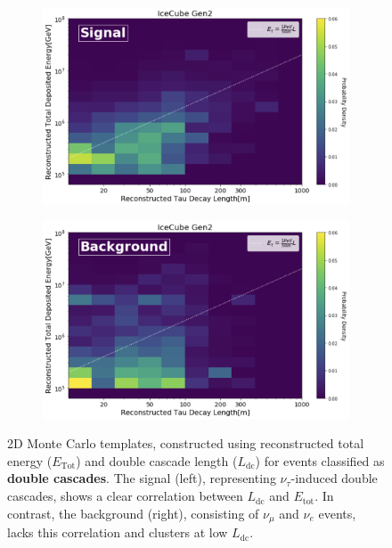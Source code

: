 \begin{figure}[h]
    \begin{subfigure}[h]{0.7\textwidth}
        \includegraphics{./figures/gen2/Signal_PDF.png}
    \end{subfigure}
    \hfill
    \begin{subfigure}[h]{0.7\textwidth}
        \includegraphics{./figures/gen2/Bkg_PDF.png}
       
    \end{subfigure}
    \caption{2D Monte Carlo templates, constructed using reconstructed total energy ($E_{\text{Tot}}$) and double cascade length ($L_{\text{dc}}$) for events classified as \textbf{double cascades}. The signal (left), representing $\nu_\tau$-induced double cascades, shows a clear correlation between $L_{\text{dc}}$ and $E_{\text{tot}}$. In contrast, the background (right), consisting of $\nu_\mu$ and $\nu_e$ events, lacks this correlation and clusters at low $L_{\text{dc}}$.}
    
\end{figure}


